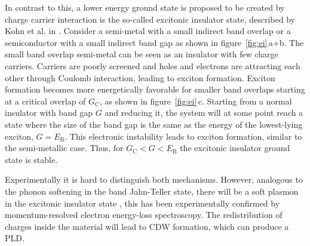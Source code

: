 In contrast to this, a lower energy ground state is proposed to be created by charge carrier interaction is the so-called excitonic insulator state, described by Kohn et al. in \cite{jerome1967, kohn1967}.
Consider a semi-metal with a small indirect band overlap or a semiconductor with a small indirect band gap as shown in figure~\ref{fig:ei}\,a+b.
The small band overlap semi-metal can be seen as an insulator with few charge carriers.
Carriers are poorly screened and holes and electrons are attracting each other through Coulomb interaction, leading to exciton formation.
Exciton formation becomes more energetically favorable for smaller band overlaps starting at a critical overlap of $G_\mathrm{C}$, as shown in figure~\ref{fig:ei}\,c.
Starting from a normal insulator with band gap $G$ and reducing it, the system will at some point reach a state where the size of the band gap is the same as the energy of the lowest-lying exciton, $G=E_\mathrm{B}$.
This electronic instability leads to exciton formation, similar to the semi-metallic case.
Thus, for $G_\mathrm{C}<G<E_\mathrm{B}$ the excitonic insulator ground state is stable.

Experimentally it is hard to distinguish both mechanisms.
However, analogous to the phonon softening in the band Jahn-Teller state, there will be a soft plasmon in the excitonic insulator state \cite{kohn1967, rossnagel2011}, this has been experimentally confirmed by momentum-resolved electron energy-loss spectroscopy\cite{kogar2017}.
The redistribution of charges inside the material will lead to \ac{CDW} formation, which can produce a \ac{PLD}.

